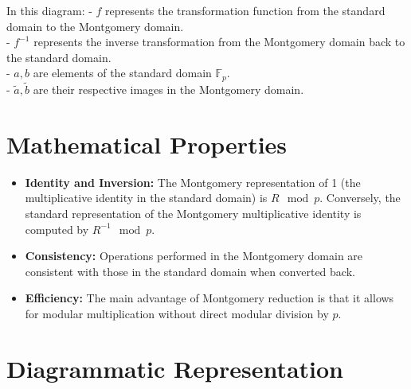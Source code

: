 \begin{center}
\end{center}


In this diagram:
- $f$ represents the transformation function from the standard domain to the Montgomery domain.\\
- $f^{-1}$ represents the inverse transformation from the Montgomery domain back to the standard domain.\\
- $a, b$ are elements of the standard domain $\mathbb{F}_p$.\\
- $\widetilde{a}, \widetilde{b}$ are their respective images in the Montgomery domain.

\section*{Mathematical Properties}

\begin{itemize}
	\item \textbf{Identity and Inversion:} The Montgomery representation of 1 (the multiplicative identity in the standard domain) is $R \mod p$. Conversely, the standard representation of the Montgomery multiplicative identity is computed by $R^{-1} \mod p$.
	\item \textbf{Consistency:} Operations performed in the Montgomery domain are consistent with those in the standard domain when converted back.
	\item \textbf{Efficiency:} The main advantage of Montgomery reduction is that it allows for modular multiplication without direct modular division by $p$.
\end{itemize}

\section*{Diagrammatic Representation}

